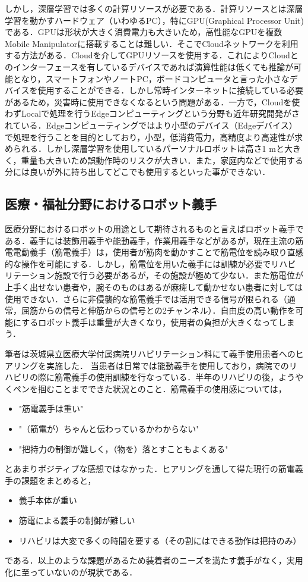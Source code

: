 しかし，深層学習では多くの計算リソースが必要である．計算リソースとは深層学習を動かすハードウェア（いわゆるPC），特にGPU(Graphical Processor Unit)である．GPUは形状が大きく消費電力も大きいため，高性能なGPUを複数Mobile Manipulatorに搭載することは難しい．そこでCloudネットワークを利用する方法がある．Cloudを介してGPUリソースを使用する．これによりCloudとのインターフェースを有しているデバイスであれば演算性能は低くても推論が可能となり，スマートフォンやノートPC，ボードコンピュータと言った小さなデバイスを使用することができる．しかし常時インターネットに接続している必要があるため，災害時に使用できなくなるという問題がある．一方で，Cloudを使わずLocalで処理を行うEdgeコンピューティングという分野も近年研究開発がされている．Edgeコンピューティングではより小型のデバイス（Edgeデバイス）で処理を行うことを目的としており，小型，低消費電力，高精度より高速性が求められる．しかし深層学習を使用しているパーソナルロボットは高さ1 mと大きく，重量も大きいため誤動作時のリスクが大きい．また，家庭内などで使用する分には良いが外に持ち出してどこでも使用するといった事ができない．


\subsection{医療・福祉分野におけるロボット義手}
医療分野におけるロボットの用途として期待されるものと言えばロボット義手である．義手には装飾用義手や能動義手，作業用義手などがあるが，現在主流の筋電電動義手（筋電義手）は，使用者が筋肉を動かすことで筋電位を読み取り直感的な操作を可能にする．しかし，筋電位を用いた義手には訓練が必要でリハビリテーション施設で行う必要があるが，その施設が極めて少ない\cite{リハビリテーション}．また筋電位が上手く出せない患者や，腕そのものはあるが麻痺して動かせない患者に対しては使用できない．さらに非侵襲的な筋電義手では活用できる信号が限られる（通常，屈筋からの信号と伸筋からの信号との2チャンネル）．自由度の高い動作を可能にするロボット義手は重量が大きくなり，使用者の負担が大きくなってしまう．

筆者は茨城県立医療大学付属病院リハビリテーション科にて義手使用患者へのヒアリングを実施した．
当患者は日常では能動義手を使用しており，病院でのリハビリの際に筋電義手の使用訓練を行なっている．半年のリハビリの後，ようやくペンを掴むことまでできた状況とのこと．筋電義手の使用感については，
\begin{itemize}
    \item "筋電義手は重い"
    \item "（筋電が）ちゃんと伝わっているかわからない"
    \item "把持力の制御が難しく，（物を）落とすこともよくある"
\end{itemize}
とあまりポジティブな感想ではなかった．ヒアリングを通して得た現行の筋電義手の課題をまとめると，
\begin{itemize}
    \item 義手本体が重い
    \item 筋電による義手の制御が難しい
    \item リハビリは大変で多くの時間を要する（その割にはできる動作は把持のみ）
\end{itemize}
である．以上のような課題があるため装着者のニーズを満たす義手がなく，実用化に至っていないのが現状である．

